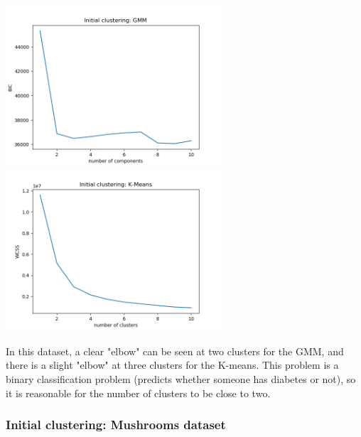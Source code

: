 \documentclass[11pt]{article}
\begin{document}
            \includegraphics[width=8cm]{../pima/clustering1/gmm_init.png}
            \includegraphics[width=8cm]{../pima/clustering1/km_init.png}

            In this dataset, a clear "elbow" can be seen at two clusters for the GMM,
            and there is a slight "elbow" at three clusters for the K-means. This problem
            is a binary classification problem (predicts whether someone has diabetes or not),
            so it is reasonable for the number of clusters to be close to two.

            \subsubsection{Initial clustering: Mushrooms dataset}
\end{document}
